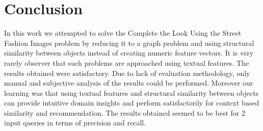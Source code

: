 \chapter{Conclusion}

In this work we attempted to solve the Complete the Look Using the Street Fashion Images problem by reducing it to a graph problem and using structural similarity between objects instead of creating numeric feature vectors. It is very rarely observer that such problems are approached using textual features. The results obtained were satisfactory. Due to lack of evaluation methodology, only manual and subjective analysis of the results could be performed. Moreover our learning was that using textual features and structural similarity between objects can provide intuitive domain insights and perform satisfactorily for context based similarity and recommendation. The results obtained seemed to be best for 2 input queries in terms of precision and recall.